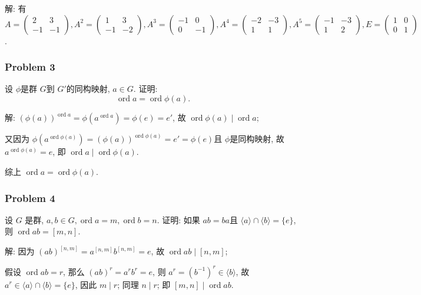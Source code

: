 \documentclass[a4paper,12pt]{ctexart}
\newcommand{\ord}{\operatorname{ord}}
\begin{document}
    解: 有 $A=\begin{pmatrix}
      2 &3\\
      -1 &-1
    \end{pmatrix},A^2= \begin{pmatrix}
      1 &3\\
      -1 &-2
    \end{pmatrix},A^3=\begin{pmatrix}
      -1 &0\\
      0 &-1
    \end{pmatrix},A^4=\begin{pmatrix}
      -2 &-3\\
      1 &1
    \end{pmatrix},A^5=\begin{pmatrix}
      -1 &-3\\
       1 &2
    \end{pmatrix},E=\begin{pmatrix}
      1 &0\\
      0 &1
    \end{pmatrix}$.

\subsubsection*{Problem 3}
  设 $ \phi $是群 $ G $到 $ G' $的同构映射, $ a\in G $. 证明:
  \[\operatorname{ord}a=\operatorname{ord}\phi(a).\]

    解: $ (\phi(a))^{\operatorname{ord}a}=\phi(a^{\operatorname{ord}a})=\phi(e)=e' $, 
    故 $ \operatorname{ord}\phi(a)\mid\operatorname{ord}a $;

    又因为 $ \phi(a^{\operatorname{ord}\phi(a)})=(\phi(a))^{\operatorname{ord}\phi(a)}=e'=\phi(e) $且 $ \phi $是同构映射,
    故 $ a^{\operatorname{ord}\phi(a)}=e $, 即 $ \operatorname{ord}a\mid\operatorname{ord}\phi(a) $.

    综上 $ \operatorname{ord}a=\operatorname{ord}\phi(a) $.

\subsubsection*{Problem 4}
    设 $ G $ 是群, $ a,b\in G,\operatorname{ord}a=m,\operatorname{ord}b =n $. 证明: 如果 $ ab=ba $且 $ \langle a\rangle\cap\langle b\rangle=\{e\} $, 则 $ \operatorname{ord}ab=[m,n] $.

    解: 因为 $ (ab)^{[n,m]}=a^{[n,m]}b^{[n,m]}=e $, 故 $ \ord ab\mid[n,m] $;

    假设 $ \ord ab = r $, 那么 $ (ab)^r=a^rb^r=e $, 则 $ a^r=(b^{-1})^r\in\langle b\rangle $, 
    故 $ a^r\in\langle a\rangle\cap\langle b\rangle=\{e\}  $, 因此 $ m\mid r $; 同理 $ n\mid r $; 即 $ [m,n]\mid \ord ab $.
\end{document}

